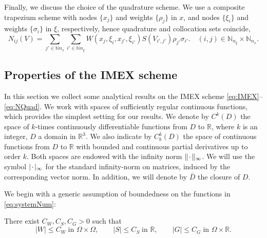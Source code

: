 \documentclass[a4paper,final]{siamart190516}
\newcommand{\Rb}{\mathbb{R}}
\newcommand{\Nb}{\mathbb{N}}
\begin{document}
Finally, we discuss the choice of the quadrature scheme. We use a composite trapezium
scheme with nodes $\{x_j\}$ and weights $\{\rho_j\}$ in $x$, and nodes $\{\xi_i\}$
and weights $\{ \sigma_i\}$ in $\xi$, respectively, hence quadrature and collocation
sets coincide,
\begin{equation} \label{eq:NQuad}
  N_{ij}(V) = \sum_{j' \in \Nb{n_x}} \sum_{i' \in \Nb{n_\xi}}
  W(x_j,\xi_i,x_{j'},\xi_{i'}) S(V_{i',j'}) \rho_{j'}\sigma_{i'}.
  \quad (i,j) \in \Nb_{n_\xi} \times \Nb_{n_x}.
\end{equation}

\subsection{Properties of the IMEX scheme}
In this section we collect some analytical results on the IMEX scheme
\eqref{eq:IMEX}--\eqref{eq:NQuad}. We work with spaces of sufficiently regular
continuous functions, which provides the simplest setting for our results. We denote
by $C^k(D)$ the space of $k$-times continuously differentiable functions from $D$ to
$\Rb$, where $k$ is an integer, $D$ a domain in $\Rb^3$. We also indicate
by $C_b^k(D)$ the space of continuous functions from $D$ to $\Rb$ with bounded and
continuous partial derivatives up to order $k$. 
Both spaces are endowed with the infinity norm $\Vert {\mkern 2mu\cdot\mkern 2mu}
\Vert_\infty$. We will use the symbol $| {\mkern 2mu\cdot\mkern 2mu} |_\infty$ for the standard
infinity-norm on matrices, induced by the corresponding vector norm. In addition, we
will denote by $\bar D$ the closure of $D$.

We begin with a generic assumption of boundedness on the functions in
\eqref{eq:systemNum}:
\begin{hypothesis}\label{hyp:boundedness}
  There exist $C_W, C_S, C_G >0 $ such that
  \[
    |W| \leq C_W \; \textrm{in $\Omega \times \Omega$},
    \qquad
    |S| \leq C_S \; \textrm{in $\Rb$},
    \qquad
    |G| \leq C_G \; \textrm{in $\Omega \times \Rb$}.
  \]
\end{hypothesis}
\end{document}
